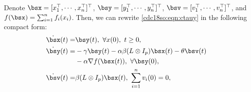 \documentclass[letterpaper, 10 pt, conference]{ieeeconf}  %
\begin{document}
Denote $\bsx=[x_1^\top,\cdots,x_n^\top]^\top$, $\bsy=[y_1^\top,\cdots,y_n^\top]^\top$, $\bsv=[v_1^\top,\cdots,v_n^\top]^\top$, and $f(\bsx)=\sum_{i=1}^nf_i(x_i)$. Then, we can rewrite \eqref{cdc18so:eqn:ctauy} in the following compact form:
\begin{subequations}\label{cdc18so:eqn:cta}
\begin{align}
    \dot{\bsx}(t) =&\bsy(t),~\forall x(0),~t\ge0,\label{cdc18so:eqn:cta2}\\
  \dot{\bsy}(t) = & - \gamma \bsy(t)-\alpha\beta (L \otimes I_p)\bsx(t) -\theta  \bsv(t)\nonumber\\
  & - \alpha \nabla f(\bsx(t)),~\forall \bsy(0),\label{cdc18so:eqn:cta3}\\
   \dot{\bsv}(t) = &\beta ( L \otimes I_p ) \bsx(t),~\sum_{i=1}^nv_i(0)=0,\label{cdc18so:eqn:cta1}
\end{align}
\end{subequations}
\end{document}
